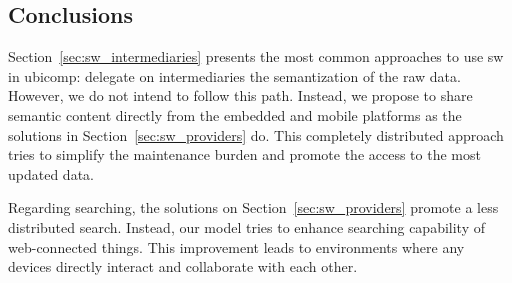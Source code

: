 \subsection{Conclusions} %

Section~\ref{sec:sw_intermediaries} presents the most common approaches to use \ac{sw} in \ac{ubicomp}: delegate on intermediaries the semantization of the raw data.
However, we do not intend to follow this path.
Instead, we propose to share semantic content directly from the embedded and mobile platforms as the solutions in Section~\ref{sec:sw_providers} do.
This completely distributed approach tries to simplify the maintenance burden and promote the access to the most updated data.


Regarding searching, the solutions on Section~\ref{sec:sw_providers} promote a less distributed search.
Instead, our model tries to enhance searching capability of web-connected things.
This improvement leads to environments where any devices directly interact and collaborate with each other.